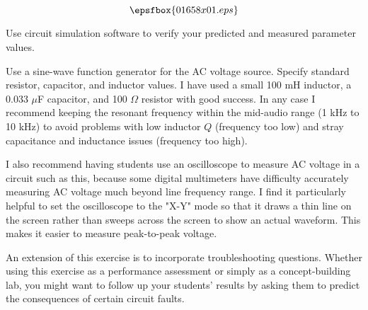 

$$\epsfbox{01658x01.eps}$$

\vfil \eject






Use circuit simulation software to verify your predicted and measured parameter values.







Use a sine-wave function generator for the AC voltage source.  Specify standard resistor, capacitor, and inductor values.  I have used a small 100 mH inductor, a 0.033 $\mu$F capacitor, and 100 $\Omega$ resistor with good success.  In any case I recommend keeping the resonant frequency within the mid-audio range (1 kHz to 10 kHz) to avoid problems with low inductor $Q$ (frequency too low) and stray capacitance and inductance issues (frequency too high).

I also recommend having students use an oscilloscope to measure AC voltage in a circuit such as this, because some digital multimeters have difficulty accurately measuring AC voltage much beyond line frequency range.  I find it particularly helpful to set the oscilloscope to the "X-Y" mode so that it draws a thin line on the screen rather than sweeps across the screen to show an actual waveform.  This makes it easier to measure peak-to-peak voltage.

An extension of this exercise is to incorporate troubleshooting questions.  Whether using this exercise as a performance assessment or simply as a concept-building lab, you might want to follow up your students' results by asking them to predict the consequences of certain circuit faults.




